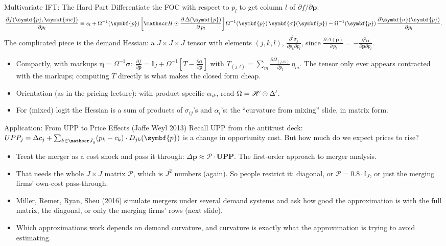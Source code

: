 \documentclass[aspectratio=169,10pt]{beamer}
\begin{document}
\begin{frame}{Multivariate IFT: The Hard Part}
Differentiate the FOC with respect to $p_l$ to get column $l$ of $\partial f / \partial \symbf{p}$:
\begin{align}
\frac{\partial f(\symbf{p},\symbf{mc})}{\partial p_l} \equiv e_l + \Omega^{-1}(\symbf{p})
\left[  \calH \odot \frac{\partial\, \Delta(\symbf{p})}{\partial\, p_l} \right]
\Omega^{-1}(\symbf{p})\,
\symbf{\sigma}(\symbf{p}) -\Omega^{-1}(\symbf{p})\, \frac{\partial \symbf{\sigma}(\symbf{p})}{\partial p_l}.
\end{align}
The complicated piece is the demand Hessian: a $J \times J \times J$ tensor with elements $(j,k,l)$, $\frac{\partial^2 \sigma_j}{\partial p_k \partial p_l}$, since $\frac{\partial\, \Delta(\symbf{p})}{\partial\, p_l} = -\frac{\partial^2 \symbf{\sigma}}{\partial \symbf{p} \partial p_l}$.
\begin{itemize}
\item Compactly, with markups $\symbf{\eta} = \Omega^{-1}\symbf{\sigma}$: $\frac{\partial f}{\partial \symbf{p}} = \mathbb{I}_J + \Omega^{-1}\left[ T - \frac{\partial \symbf{\sigma}}{\partial \symbf{p}} \right]$ with $T_{(j,l)} = \sum_m \frac{\partial \Omega_{(j,m)}}{\partial p_l}\, \eta_m$. The tensor only ever appears \alert{contracted with the markups}; computing $T$ directly is what makes the closed form cheap.
\item Orientation (as in the pricing lecture): with product-specific $\alpha_{ik}$, read $\Omega = \mathscr{H} \odot \Delta'$.
\item For (mixed) logit the Hessian is a sum of products of $\sigma_{ij}$'s and $\alpha_i$'s: the ``curvature from mixing'' slide, in matrix form.
\end{itemize}
\end{frame}


\begin{frame}{Application: From UPP to Price Effects (Jaffe Weyl 2013)}
Recall UPP from the antitrust deck: $UPP_j = \Delta c_j + \sum_{k \in \calJ_{g}}  (p_k-c_k) \cdot  D_{jk} (\symbf{p})$ is a change in \alert{opportunity cost}. But how much do we expect prices to rise?
\begin{itemize}
\item Treat the merger as a cost shock and pass it through: $\Delta \symbf{p} \approx \mathcal{P} \cdot \symbf{UPP}$. The first-order approach to merger analysis.
\item That needs the whole $J \times J$ matrix $\mathcal{P}$, which is $J^2$ numbers (again). So people restrict it: diagonal, or $\mathcal{P} = 0.8 \cdot \mathbb{I}_J$, or just the merging firms' own-cost pass-through.
\item Miller, Remer, Ryan, Sheu (2016) simulate mergers under several demand systems and ask how good the approximation is with the full matrix, the diagonal, or only the merging firms' rows (next slide).
\item Which approximations work depends on demand curvature, and curvature is exactly what the approximation is trying to avoid estimating.
\end{itemize}
\end{frame}
\end{document}
